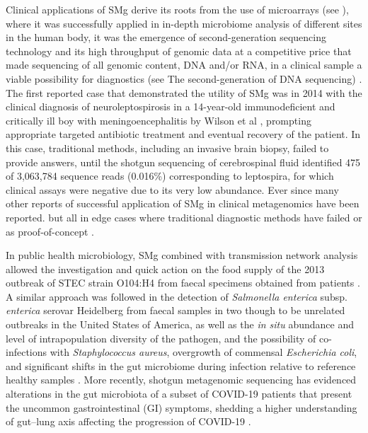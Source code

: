 Clinical applications of \ac{SMg} derive its roots from the use of microarrays (see ), where it was successfully applied in in-depth microbiome analysis of different sites in the human body, it was the emergence of second-generation sequencing technology and its high throughput of genomic data at a competitive price that made sequencing of all genomic content, \ac{DNA} and/or \ac{RNA}, in a clinical sample a viable possibility for diagnostics (see  The second-generation of \ac{DNA} sequencing) \citep{miller_basic_2009, palmer_rapid_2006, chiu_clinical_2019}. The first reported case that demonstrated the utility of \ac{SMg} was in 2014 with the clinical diagnosis of neuroleptospirosis in a 14-year-old immunodeficient and critically ill boy with meningoencephalitis by Wilson et al \cite{wilson_actionable_2014}, prompting appropriate targeted antibiotic treatment and eventual recovery of the patient. In this case, traditional methods, including an invasive brain biopsy, failed to provide answers, until the shotgun sequencing of cerebrospinal fluid identified 475 of 3,063,784 sequence reads (0.016\%) corresponding to leptospira, for which clinical assays were negative due to its very low abundance. Ever since many other reports of successful application of \ac{SMg} in clinical metagenomics have been reported. but all in edge cases where traditional diagnostic methods have failed or as proof-of-concept \citep{couto_critical_2018, vijayvargiya_application_2019, sanabria_shotgun-metagenomics_2020, hirakata_application_2021}. 

In public health microbiology, \ac{SMg} combined with transmission network analysis allowed the investigation and quick action on the food supply of the 2013 outbreak of \ac{STEC} strain O104:H4 from faecal specimens obtained from patients \citep{loman_culture-independent_2013}. A similar approach was followed in the detection of \textit{Salmonella enterica} subsp. \textit{enterica} serovar Heidelberg from faecal samples in two though to be unrelated outbreaks in the United States of America, as well as the \textit{in situ} abundance and level of intrapopulation diversity of the pathogen, and the possibility of co-infections with \textit{Staphylococcus aureus}, overgrowth of commensal \textit{Escherichia coli}, and significant shifts in the gut microbiome during infection relative to reference healthy samples \citep{huang_metagenomics_2017}. More recently, shotgun metagenomic sequencing has evidenced alterations in the gut microbiota of a subset of COVID-19 patients that present the uncommon gastrointestinal (GI) symptoms, shedding a higher understanding of gut–lung axis affecting the progression of COVID-19 \citep{li_microbiome_2021}.

